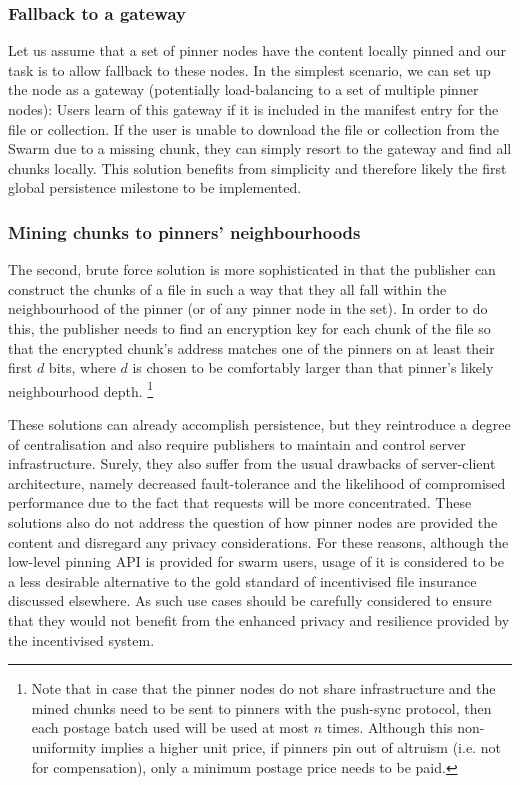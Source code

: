 \subsubsection{Fallback to a gateway}

Let us assume that a set of pinner nodes have the content locally pinned and our task is to allow fallback to these nodes. In the simplest scenario, we can set up the node as a gateway (potentially load-balancing to a set of multiple pinner nodes): Users learn of this gateway if it is included in the manifest entry for the file or collection. If the user is unable to download the file or collection from the Swarm due to a missing chunk, they can simply resort to the gateway and find all chunks locally.
This solution benefits from simplicity and therefore likely the first global persistence milestone to be implemented.  

\subsubsection{Mining chunks to pinners' neighbourhoods}

The second, brute force solution is more sophisticated in that the publisher can construct the chunks of a file in such a way that they all fall within the neighbourhood of the pinner (or of any pinner node in the set). In order to do this, the publisher needs to find an encryption key for each chunk of the file so that the encrypted chunk's address matches one of the pinners on at least their first $d$ bits, where $d$ is chosen to be comfortably larger than that pinner's likely neighbourhood depth.%
%
\footnote{Note that in case that the pinner nodes do not share infrastructure and the mined chunks need to be sent to pinners with the push-sync protocol, then each postage batch used will be used at most $n$ times. Although this non-uniformity implies a higher unit price, if pinners pin out of altruism (i.e. not for compensation), only a minimum postage price needs to be paid.
}

These solutions can already accomplish persistence, but they reintroduce a degree of centralisation and also require publishers to maintain and control server infrastructure. Surely, they also suffer from the usual drawbacks of server-client architecture, namely decreased fault-tolerance and the likelihood of compromised performance due to the fact that requests will be more concentrated. These solutions also do not address the question of how pinner nodes are provided the content and disregard any privacy considerations. For these reasons, although the low-level pinning API is provided for swarm users, usage of it is considered to be a less desirable alternative to the gold standard of incentivised file insurance discussed elsewhere. As such use cases should be carefully considered to ensure that they would not benefit from the enhanced privacy and resilience provided by the incentivised system.



